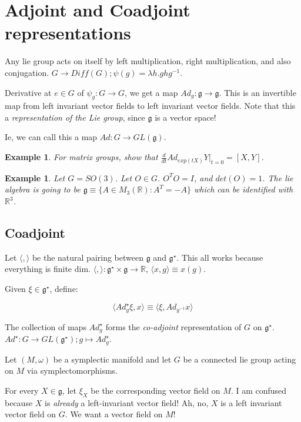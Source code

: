 \documentclass[11pt]{book}
\newtheorem{example}[theorem]{Example}
\begin{document}
\section{Adjoint and Coadjoint representations}

Any lie group acts on itself by left multiplication, right multiplication, and
also conjugation. $G \rightarrow Diff(G); \psi(g) = \lambda h. ghg^{-1}$.


Derivative at $e \in G$ of $\psi_g: G \rightarrow G$, we get a map
$Ad_g: \mathfrak g \rightarrow \mathfrak g$. This is an invertible map
from left invariant vector fields to left invariant vector fields. Note that
this a \emph{representation of the Lie group}, since $\mathfrak g$ is
a vector space!


Ie, we can call this a map $Ad: G \rightarrow GL(\mathfrak g)$.


\begin{example}
For matrix groups, show that $\frac{d}{dt} A d_{exp(tX)} Y |_{t = 0} = [X, Y]$.
\end{example}

\begin{example}
Let $G = SO(3)$. Let $O \in G$. $O^T O = I$, and $det(O) = 1$. The lie algebra
is going to be $\mathfrak{g} \equiv \{ A \in M_3(\mathbb R) : A^T = -A \}$
which can be identified with $\mathbb R^3$.
\end{example}

\subsection{Coadjoint}

Let $\langle, \rangle$ be the natural pairing between $\mathfrak g$ and
$\mathfrak g^\star$. This all works because everything is finite dim.
$\langle, \rangle: \mathfrak g^\star \times \mathfrak g \rightarrow \mathbb R$,
$\langle x, g \rangle \equiv x(g)$.

Given $\xi \in \mathfrak g^\star$, define:

$$\langle Ad_g^\star \xi, x \rangle \equiv \langle \xi, Ad_{g^{-1}} x\rangle$$

The collection of maps $Ad_g^\star$ forms the \emph{co-adjoint} representation of $G$
on $\mathfrak g^\star$. $Ad^\star: G \rightarrow GL(\mathfrak g^\star); g \mapsto Ad_g^\star$.


Let $(M, \omega)$ be a symplectic manifold and let $G$ be a connected lie group
acting on $M$ via symplectomorphisms.


For every $X \in \mathfrak g$, let $\xi_X$ be the corresponding vector field
on $M$. I am confused because $X$ is \emph{already} a left-invariant vector field!
Ah, no, $X$ is a left invariant vector field on $G$. We want a vector
field on $M$!
\end{document}
